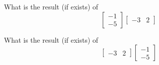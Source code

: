 \bexo

What is the result (if exists) of 
\begin{equation*}
\left[
\begin{array}{cc}
    -1  \\
    -5  
\end{array}
\right]
\left[
\begin{array}{cc}
-3 & 2
\end{array}
\right]
\end{equation*}

What is the result (if exists) of 
\begin{equation*}
\left[
\begin{array}{cc}
-3 & 2
\end{array}
\right]\left[
\begin{array}{cc}
    -1  \\
    -5  
\end{array}
\right]
\end{equation*}
\eexo
\solution{ 
}